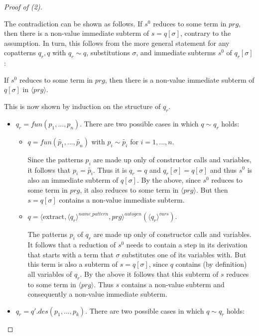 \documentclass[11pt]{article} %
\begin{document}
\begin{proof}[Proof of (2)]
\begin{enumerate}
The contradiction can be shown as follows. If $s^0$ reduces to some term in $prg$, then there is a non-value immediate subterm of $s = q[\sigma]$, contrary to the assumption. In turn, this follows from the more general statement for any copatterns $q_r, q$ with $q_r \sim q$, substitutions $\sigma$, and immediate subterms $s^0$ of $q_r[\sigma]$:

If $s^0$ reduces to some term in $prg$, then there is a non-value immediate subterm of $q[\sigma]$ in $\langle prg \rangle$.

This is now shown by induction on the structure of $q_r$.

\begin{itemize}

\item $q_r = fun(p_1, ..., p_n)$. There are two possible cases in which $q \sim q_r$ holds:

\begin{itemize}

\item $q = fun(\widetilde{p_1}, ..., \widetilde{p_n})$ with $p_i \sim \widetilde{p_i}$ for $i = 1, ..., n$.

Since the patterns $p_i$ are made up only of constructor calls and variables, it follows that $p_i = \widetilde{p_i}$. Thus it is $q_r = q$ and $q_r[\sigma] = q[\sigma]$ and thus $s^0$ is also an immediate subterm of $q[\sigma]$. By the above, since $s^0$ reduces to some term in $prg$, it also reduces to some term in $\langle prg \rangle$. But then $s = q[\sigma]$ contains a non-value immediate subterm.

\item $q = \langle \textrm{extract}, \langle q_r \rangle^{name\_pattern}, prg \rangle^{autogen}(\langle q_r \rangle^{vars})$.

The patterns $p_i$ of $q_r$ are made up only of constructor calls and variables. It follows that a reduction of $s^0$ needs to contain a step in its derivation that starts with a term that $\sigma$ substitutes one of its variables with. But this term is also a subterm of $s = q[\sigma]$, since $q$ contains (by definition) all variables of $q_r$. By the above it follows that this subterm of $s$ reduces to some term in $\langle prg \rangle$. Thus $s$ contains a non-value subterm and consequently a non-value immediate subterm.

\end{itemize}

\item $q_r = q'.des(p_1, ..., p_k)$. There are two possible cases in which $q \sim q_r$ holds:


\end{itemize}
\end{enumerate}
\end{proof}
\end{document}
